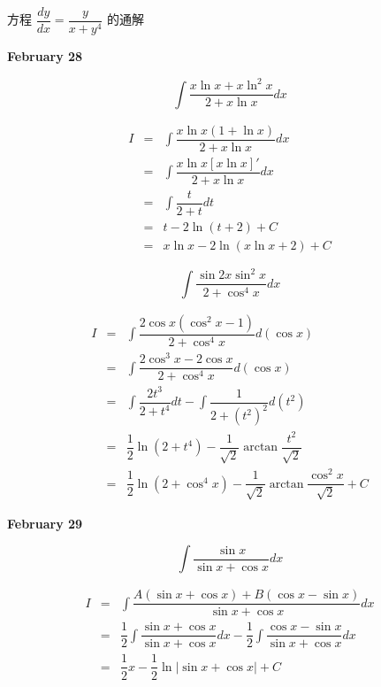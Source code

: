 \begin{example}[][Exam: 28.4.12]
	方程 $\dfrac{dy}{dx}=\dfrac{y}{x+y^{4}}$ 的通解
\end{example}

\textcolor{purplea}{\textbf{February 28}}

\begin{example}[][Exam: 28.4.13]
	$$\int\dfrac{x\ln x+x\ln^{2}x}{2+x\ln x}dx$$
\end{example}
\begin{solution}
	\begin{eqnarray*}
		I & = & \int\dfrac{x\ln x(1+\ln x)}{2+x\ln x}dx\\
		  & = & \int\dfrac{x\ln x\left[x\ln x\right]'}{2+x\ln x}dx\\
		  & = & \int\dfrac{t}{2+t}dt\\
		  & = & t - 2\ln(t+2) + C\\
		  & = & x\ln x - 2\ln(x\ln x + 2) + C
	\end{eqnarray*}
\end{solution}
\begin{example}[][Exam: 28.4.14]
	$$\int\dfrac{\sin 2x\sin^{2}x}{2+\cos^{4} x}dx$$
\end{example}
\begin{solution}
	\begin{eqnarray*}
		I & = & \int\dfrac{2\cos x(\cos^{2}x-1)}{2+\cos^{4} x}d(\cos x)\\
		  & = & \int\dfrac{2\cos^{3} x - 2\cos x}{2+\cos^{4} x}d(\cos x)\\
		  & = & \int\dfrac{2t^{3}}{2+t^{4}}dt - \int \dfrac{1}{2+(t^{2})^{2}}d(t^{2})\\
		  & = & \dfrac{1}{2}\ln(2+t^{4}) - \dfrac{1}{\sqrt{2}}\arctan \dfrac{t^{2}}{\sqrt{2}}\\
		  & = & \dfrac{1}{2}\ln(2+\cos^{4} x) - \dfrac{1}{\sqrt{2}}\arctan \dfrac{\cos^{2} x}{\sqrt{2}} + C
	\end{eqnarray*}
\end{solution}

\textcolor{purplea}{\textbf{February 29}}
\begin{example}[][Exam: 28.4.15]
	$$\int\dfrac{\sin x}{\sin x+\cos x}dx$$
\end{example}
\begin{solution}
	\begin{eqnarray*}
		I & = & \int\dfrac{A(\sin x + \cos x) + B(\cos  x-\sin x)}{\sin x+\cos x}dx\\
		  & = & \dfrac{1}{2}\int\dfrac{\sin x+\cos x}{\sin x+\cos x}dx - \dfrac{1}{2}\int \dfrac{\cos x-\sin x}{\sin x+\cos x}dx\\
		  & = & \dfrac{1}{2}x - \dfrac{1}{2}\ln|\sin x+\cos x| + C
	\end{eqnarray*}
\end{solution}

